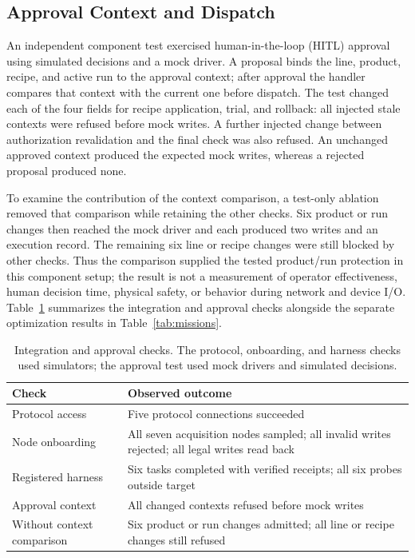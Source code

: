 \subsection{Approval Context and Dispatch}
An independent component test exercised human-in-the-loop (HITL) approval
using simulated decisions and a mock driver. A proposal binds the line,
product, recipe, and active run to the approval context; after approval the
handler compares that context with the current one before dispatch. The test
changed each of the four fields for recipe application, trial, and rollback:
all injected stale contexts were refused before mock writes. A further injected
change between authorization revalidation and the final check was also
refused. An unchanged approved context produced the expected mock writes,
whereas a rejected proposal produced none.

To examine the contribution of the context comparison, a test-only ablation
removed that comparison while retaining the other checks. Six product or run
changes then reached the mock driver and each produced two writes and an
execution record. The remaining six line or recipe changes were still blocked
by other checks. Thus the comparison supplied the tested product/run
protection in this component setup; the result is not a measurement of
operator effectiveness, human decision time, physical safety, or behavior
during network and device I/O.
Table~\ref{tab:integration-checks} summarizes the integration and approval
checks alongside the separate optimization results in Table~\ref{tab:missions}.

\begin{table}[!t]
\centering
\caption{Integration and approval checks. The protocol, onboarding, and
harness checks used simulators; the approval test used mock drivers and
simulated decisions.}
\label{tab:integration-checks}
\footnotesize
\setlength{\tabcolsep}{3pt}
\begin{tabularx}{\columnwidth}{@{}>{\raggedright\arraybackslash}p{2.15cm}X@{}}
\toprule
Check & Observed outcome \\
\midrule
Protocol access & Five protocol connections succeeded \\
Node onboarding & All seven acquisition nodes sampled; all invalid writes rejected; all legal writes read back \\
Registered harness & Six tasks completed with verified receipts; all six probes outside target \\
Approval context & All changed contexts refused before mock writes \\
Without context comparison & Six product or run changes admitted; all line or recipe changes still refused \\
\bottomrule
\end{tabularx}
\end{table}


